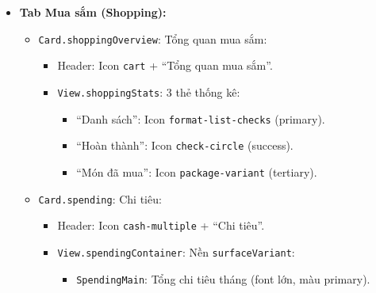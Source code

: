 \begin{itemize}
\begin{itemize}
\begin{itemize}
                    \item \texttt{View.statsGrid}: Lưới 2x2 hiển thị:
                        \begin{itemize}
                            \item Tổng số món (màu mặc định)
                            \item Còn tốt (màu \texttt{success})
                            \item Sắp hết hạn (màu \texttt{warning})
                            \item Hết hạn (màu \texttt{error})
                        \end{itemize}
                \end{itemize}
        \end{itemize}
    \item \textbf{Tab Mua sắm (Shopping):}
        \begin{itemize}
            \item \texttt{Card.shoppingOverview}: Tổng quan mua sắm:
                \begin{itemize}
                    \item Header: Icon \texttt{cart} + ``Tổng quan mua sắm''.
                    \item \texttt{View.shoppingStats}: 3 thẻ thống kê:
                        \begin{itemize}
                            \item ``Danh sách'': Icon \texttt{format-list-checks} (primary).
                            \item ``Hoàn thành'': Icon \texttt{check-circle} (success).
                            \item ``Món đã mua'': Icon \texttt{package-variant} (tertiary).
                        \end{itemize}
                \end{itemize}
            \item \texttt{Card.spending}: Chi tiêu:
                \begin{itemize}
                    \item Header: Icon \texttt{cash-multiple} + ``Chi tiêu''.
                    \item \texttt{View.spendingContainer}: Nền \texttt{surfaceVariant}:
                        \begin{itemize}
                            \item \texttt{SpendingMain}: Tổng chi tiêu tháng (font lớn, màu primary).

\end{itemize}
\end{itemize}
\end{itemize}
\end{itemize}
